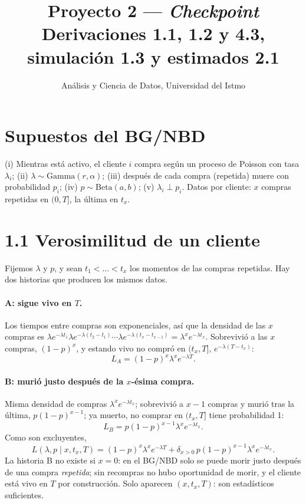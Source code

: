 \documentclass[11pt]{article}
\title{Proyecto 2 --- \textit{Checkpoint}\\\large Derivaciones 1.1, 1.2 y 4.3, simulación 1.3 y estimados 2.1}
\author{Análisis y Ciencia de Datos, Universidad del Istmo}
\date{}
\begin{document}
\maketitle

\section*{Supuestos del BG/NBD}
(i) Mientras está activo, el cliente $i$ compra según un proceso de Poisson con tasa $\lambda_i$;
(ii) $\lambda\sim\text{Gamma}(r,\alpha)$;
(iii) después de cada compra (repetida) muere con probabilidad $p_i$;
(iv) $p\sim\text{Beta}(a,b)$;
(v) $\lambda_i\perp p_i$.
Datos por cliente: $x$ compras repetidas en $(0,T]$, la última en $t_x$.

\section*{1.1 Verosimilitud de un cliente}
Fijemos $\lambda$ y $p$, y sean $t_1<\dots<t_x$ los momentos de las compras repetidas. Hay dos historias que producen los mismos datos.

\paragraph{A: sigue vivo en $T$.} Los tiempos entre compras son exponenciales, así que la densidad de las $x$ compras es
$\lambda e^{-\lambda t_1}\lambda e^{-\lambda(t_2-t_1)}\cdots\lambda e^{-\lambda(t_x-t_{x-1})}=\lambda^xe^{-\lambda t_x}$.
Sobrevivió a las $x$ compras, $(1-p)^x$, y estando vivo no compró en $(t_x,T]$, $e^{-\lambda(T-t_x)}$:
\[L_A=(1-p)^x\lambda^xe^{-\lambda T}.\]

\paragraph{B: murió justo después de la $x$-ésima compra.} Misma densidad de compras $\lambda^xe^{-\lambda t_x}$; sobrevivió a $x-1$ compras y murió tras la última, $p(1-p)^{x-1}$; ya muerto, no comprar en $(t_x,T]$ tiene probabilidad 1:
\[L_B=p(1-p)^{x-1}\lambda^xe^{-\lambda t_x}.\]
Como son excluyentes,
\[L(\lambda,p\mid x,t_x,T)=(1-p)^x\lambda^xe^{-\lambda T}+\delta_{x>0}\,p(1-p)^{x-1}\lambda^xe^{-\lambda t_x}.\]
La historia B no existe si $x=0$: en el BG/NBD solo se puede morir justo después de una compra \emph{repetida}; sin recompras no hubo oportunidad de morir, y el cliente está vivo en $T$ por construcción. Solo aparecen $(x,t_x,T)$: son estadísticos suficientes.
\end{document}
